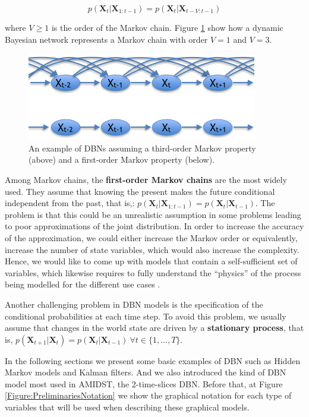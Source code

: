 $$p(\bm X_t| \bm X_{1:t-1})  = p(\bm X_t|\bm X_{t-V:t-1})$$

\noindent where $V\geq 1$ is the order of the Markov chain.   Figure \ref{Figure:markovChain} show how a dynamic Bayesian network represents a Markov chain with order $V=1$ and $V=3$. 


\begin{figure}[ht!]
\begin{center}
\includegraphics[scale=0.56]{./figures/PreliminariesMarkovChain}
\caption{\label{Figure:markovChain} An example of DBNs assuming a third-order Markov property (above) and a first-order Markov property (below).
}
\end{center}
\end{figure}

Among Markov chains, the \textbf{first-order Markov chains} are the most widely used. They assume that knowing the present makes the future conditional independent from the past, that is,: $p(\bm X_t| \bm X_{1:t-1})  = p(\bm X_t|\bm X_{t-1})$. The problem is that this could be an unrealistic assumption in some problems leading to poor approximations of the joint distribution. In order to increase the accuracy of the approximation, we could either increase the Markov order or equivalently, increase the number of state variables, which would also increase the complexity. Hence, we would like to come up with models that contain a self-sufficient set of variables, which likewise requires to fully understand the ``physics''  of the process being modelled for the different use cases \cite{russelNorvig2009}. 

Another challenging problem in  DBN models is the specification of the conditional probabilities at each time step. To avoid this problem, we usually assume that changes in the world state are driven by a \textbf{stationary process}, that is, $p(\bm X_{t+1}|\bm X_{t}) = p(\bm X_t|\bm X_{t-1})\ \forall t \in\{1,\ldots,T\}$. 



In the following sections we present some basic examples of DBN such as Hidden Markov models and Kalman filters. And we also introduced the kind of DBN model most used in AMIDST, the 2-time-slices DBN. Before that, at Figure \ref{Figure:PreliminariesNotation} we show the graphical notation for each type of variables that will be used when describing these graphical models.  


